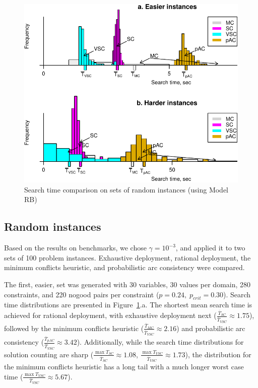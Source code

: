 \begin{figure}[h] 
\centering
\includegraphics[scale=0.75]{csp-random-problems-arrows+legend.pdf}
\caption{Search time comparison on sets of random instances (using
  Model RB)}
\label{fig:random-problems}
\end{figure}

\subsection{Random instances}

Based on the results on benchmarks, we chose $\gamma=10^{-3}$, and
applied it to two sets of 100 problem instances. 
Exhaustive deployment, rational deployment, the
minimum conflicts heuristic, and probabilistic arc consistency
were compared.

The first, easier, set was generated with 30 variables, 30 values per
domain, 280 constraints, and 220 nogood pairs per constraint
($p=0.24,\;p_{crit}=0.30$). Search time distributions are presented in
Figure~\ref{fig:random-problems}.a. The shortest mean search time is
achieved for rational deployment, with exhaustive deployment
next ($\frac {\overline T_{SC}} {\overline T_{VSC}}
\approx 1.75 $), followed by the minimum conflicts heuristic ($\frac
{\overline T_{MC}} {\overline T_{VSC}} \approx 2.16$) and 
probabilistic arc consistency ($\frac {\overline T_{pAC}} {\overline
  T_{VSC}} \approx 3.42$). Additionally,
while the search time distributions for solution counting are sharp
($\frac {\max T_{SC}} {\overline T_{SC}} \approx 1.08$, $\frac {\max
T_{VSC}} {\overline T_{VSC}} \approx 1.73$), the distribution for the
minimum conflicts heuristic has a long tail with a much longer worst
case time ($\frac {\max T_{VSC}} {\overline T_{VSC}} \approx 5.67$).

